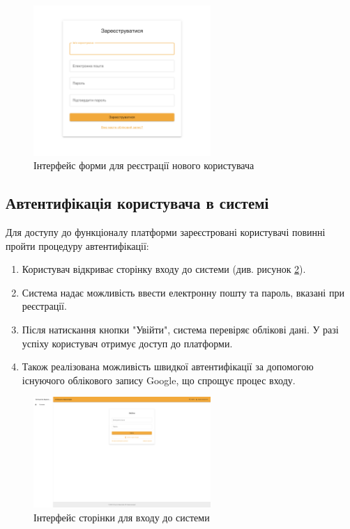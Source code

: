 \begin{figure}[htbp]
    \centering
    \includegraphics[width=0.6\textwidth]{practice_report/images/registration_form.png}
    \caption{Інтерфейс форми для реєстрації нового користувача}
    \label{fig:task_registration_form}
\end{figure}


\subsection{Автентифікація користувача в системі}
\label{subsec:task_login}
Для доступу до функціоналу платформи зареєстровані користувачі повинні пройти процедуру автентифікації:
\begin{enumerate}
    \item Користувач відкриває сторінку входу до системи (див. рисунок \ref{fig:task_login_page}).
    \item Система надає можливість ввести електронну пошту та пароль, вказані при реєстрації.
    \item Після натискання кнопки "Увійти", система перевіряє облікові дані. У разі успіху користувач отримує доступ до платформи.
    \item Також реалізована можливість швидкої автентифікації за допомогою існуючого облікового запису Google, що спрощує процес входу.
\end{enumerate}

\begin{figure}[htbp]
    \centering
    \includegraphics[width=0.6\textwidth]{practice_report/images/login_page.png}
    \caption{Інтерфейс сторінки для входу до системи}
    \label{fig:task_login_page}
\end{figure}

